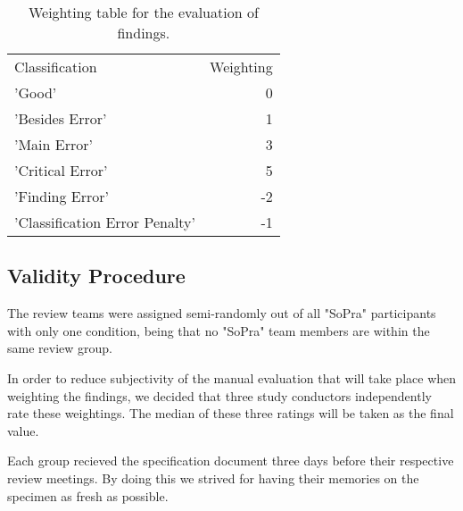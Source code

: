 \begin{table}
\centering
\begin{tabular}{lr}
  \rowcolor{heading}Classification & Weighting \\
  \rowcolor{a}'Good' & 0 \\
  \rowcolor{b}'Besides Error' & 1 \\
  \rowcolor{a}'Main Error' & 3 \\
  \rowcolor{b}'Critical Error' & 5 \\
  \rowcolor{a}'Finding Error' & -2 \\
  \rowcolor{b}'Classification Error Penalty' & -1 \\
\end{tabular}
\caption{Weighting table for the evaluation of findings.}
\label{tab:ratings}
\end{table}

\subsection{Validity Procedure}

The review teams were assigned semi-randomly out of all "SoPra" participants with only one condition, being that no "SoPra" team members are within the same review group.

In order to reduce subjectivity of the manual evaluation that will take place when weighting the findings, we decided that three study conductors independently rate these weightings. The median of these three ratings will be taken as the final value.

Each group recieved the specification document three days before their respective review meetings. By doing this we strived for having their memories on the specimen as fresh as possible.
